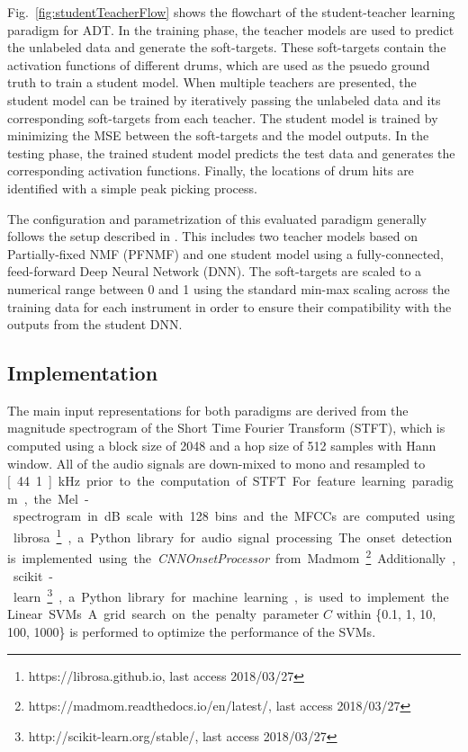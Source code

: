 \documentclass{article}
\begin{document}
Fig.~\ref{fig:studentTeacherFlow} shows the flowchart of the student-teacher learning paradigm for ADT. In the training phase, the teacher models are used to predict the unlabeled data and generate the soft-targets. These soft-targets contain the activation functions of different drums, which are used as the psuedo ground truth to train a student model. 
When multiple teachers are presented, the student model can be trained by iteratively passing the unlabeled data and its corresponding soft-targets from each teacher. The student model is trained by minimizing the MSE between the soft-targets and the model outputs. 
In the testing phase, the trained student model predicts the test data and generates the corresponding activation functions. Finally, the locations of drum hits are identified with a simple peak picking process. 

The configuration and parametrization of this evaluated paradigm generally follows the setup described in \cite{Wu2017}. This includes two teacher models based on Partially-fixed NMF (PFNMF) \cite{Wu2015_ismir} and one student model using a fully-connected, feed-forward Deep Neural Network (DNN). The soft-targets are scaled to a numerical range between 0 and 1 using the standard min-max scaling across the training data for each instrument in order to ensure their compatibility with the outputs from the student DNN. 
\subsection{Implementation}
The main input representations for both paradigms are derived from the magnitude spectrogram of the Short Time Fourier Transform (STFT), which is computed using a block size of 2048 and a hop size of 512 samples with Hann window. All of the audio signals are down-mixed to mono and resampled to \unit[44.1]{kHz} prior to the computation of STFT. 

For feature learning paradigm, the Mel-spectrogram in dB scale with 128 bins and the MFCCs are computed using librosa\footnote{https://librosa.github.io, last access 2018/03/27}, a Python library for audio signal processing. The onset detection is implemented using the \textit{CNNOnsetProcessor} from Madmom\footnote{https://madmom.readthedocs.io/en/latest/, last access 2018/03/27}. Additionally, scikit-learn\footnote{http://scikit-learn.org/stable/, last access 2018/03/27}, a Python library for machine learning, is used to implement  the Linear SVMs. A grid search on the penalty parameter $C$ within \{0.1, 1, 10, 100, 1000\} is performed to optimize the performance of the SVMs. 
\end{document}
